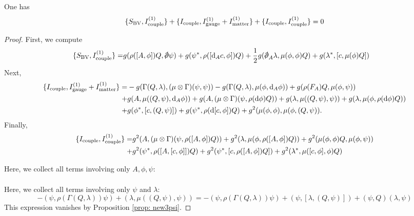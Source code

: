 \documentclass[10pt, oneside]{article}
\begin{document}
\begin{lem} One has
\[
\{S_{\rm BV} , I^{(1)}_{\rm couple}\} + \{I_{\rm couple}, I^{(1)}_{\rm gauge} + I^{(1)}_{\rm matter}\} + \{I_{\rm couple}, I^{(1)}_{\rm couple}\}  =  0 
\]
\end{lem}
\begin{proof}
First, we compute
\begin{align*}
\{S_{\rm BV} , I^{(1)}_{\rm couple}\} = & g (\rho([A, \phi]) Q, \sd \dd \psi) + g (\psi^*, \rho([\d_A c, \phi]) Q) + \frac{1}{2} g (\sd \dd_A \lambda, \mu(\phi, \phi) Q) + g (\lambda^*, [c, \mu(\phi) Q]) 
\end{align*}
Next,
\begin{align*}
\{I_{\rm couple} , I^{(1)}_{\rm gauge} + I^{(1)}_{\rm matter}\} = & - g (\Gamma(Q, \lambda), (\mu \otimes \Gamma)(\psi,\psi)) - g (\Gamma(Q, \lambda), \mu(\phi, {\rm d}_A \phi)) + g (\rho(F_A)Q , \mu(\phi, \psi)) \\ + & g (A, \mu((Q, \psi), {\rm d}_A \phi)) + g (A, (\mu \otimes \Gamma)(\psi, \rho({\rm d} \phi) Q)) + g (\lambda, \mu((Q, \psi), \psi)) + g (\lambda, \mu(\phi, \rho({\rm d} \phi)  Q)) \\ + & g (\phi^*, [c, (Q,\psi)])  + g (\psi^*, \rho({\rm d} [c , \phi ]) Q) + g^2 (\mu(\phi, \phi) , \mu(\phi, (Q, \psi)) . 
\end{align*}
Finally,
\begin{align*}
\{I_{\rm couple}, I^{(1)}_{\rm couple}\} = & g^2 (A, (\mu \otimes \Gamma)(\psi, \rho([A, \phi]) Q)) + g^2 (\lambda, \mu(\phi, \rho([A, \phi]) Q)) + g^2 (\mu(\phi, \phi)Q , \mu(\phi, \psi)) \\
+ &g^2 (\psi^*, \rho([A, [c,\phi]]) Q) + g^2 (\psi^*, [c, \rho([A,\phi])Q]) + g^2 (\lambda^*, \mu([c,\phi], \phi) Q)  
\end{align*}

Here, we collect all terms involving only $A, \phi, \psi$:
\begin{align*}
& 
\end{align*} 

Here, we collect all terms involving only $\psi$ and $\lambda$:
\[
- (\psi, \rho(\Gamma(Q, \lambda)) \psi) + (\lambda, \mu((Q,\psi), \psi)) = - (\psi, \rho(\Gamma(Q, \lambda)) \psi) + (\psi, [\lambda, (Q, \psi)]) + (\psi, Q) (\lambda, \psi)
\]
This expression vanishes by Proposition \ref{prop: new3psi}.


\end{proof}
\end{document}
